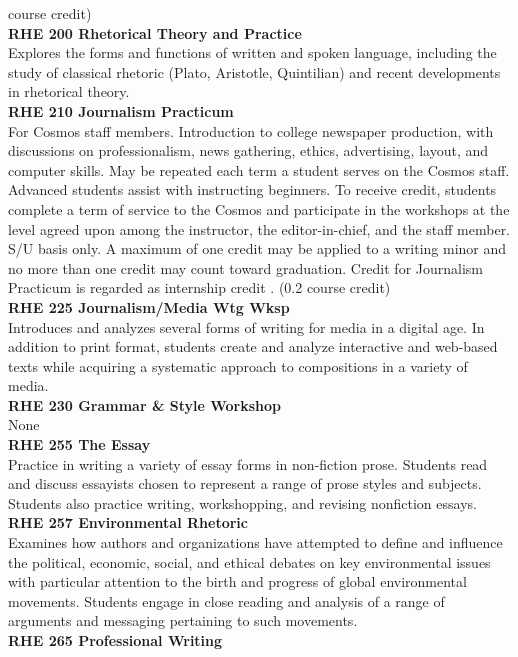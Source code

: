 \documentclass[
  letterpaper,
]{scrbook}
\begin{document}
course credit)\\
\textbf{RHE 200 Rhetorical Theory and Practice}\\
Explores the forms and functions of written and spoken language,
including the study of classical rhetoric (Plato, Aristotle, Quintilian)
and recent developments in rhetorical theory.\\
\textbf{RHE 210 Journalism Practicum}\\
For Cosmos staff members. Introduction to college newspaper production,
with discussions on professionalism, news gathering, ethics,
advertising, layout, and computer skills. May be repeated each term a
student serves on the Cosmos staff. Advanced students assist with
instructing beginners. To receive credit, students complete a term of
service to the Cosmos and participate in the workshops at the level
agreed upon among the instructor, the editor-in-chief, and the staff
member. S/U basis only. A maximum of one credit may be applied to a
writing minor and no more than one credit may count toward graduation.
Credit for Journalism Practicum is regarded as internship credit . (0.2
course credit)\\
\textbf{RHE 225 Journalism/Media Wtg Wksp}\\
Introduces and analyzes several forms of writing for media in a digital
age. In addition to print format, students create and analyze
interactive and web-based texts while acquiring a systematic approach to
compositions in a variety of media.\\
\textbf{RHE 230 Grammar \& Style Workshop}\\
None\\
\textbf{RHE 255 The Essay}\\
Practice in writing a variety of essay forms in non-fiction prose.
Students read and discuss essayists chosen to represent a range of prose
styles and subjects. Students also practice writing, workshopping, and
revising nonfiction essays.\\
\textbf{RHE 257 Environmental Rhetoric}\\
Examines how authors and organizations have attempted to define and
influence the political, economic, social, and ethical debates on key
environmental issues with particular attention to the birth and progress
of global environmental movements. Students engage in close reading and
analysis of a range of arguments and messaging pertaining to such
movements.\\
\textbf{RHE 265 Professional Writing}\\
\end{document}
